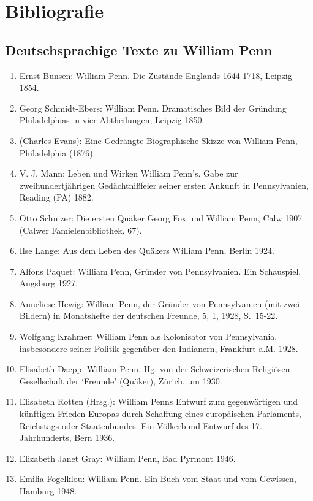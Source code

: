 \chapter{Bibliografie}


\section{Deutschsprachige Texte zu William Penn}

\begin{enumerate}
\item  Ernst Bunsen: William Penn. Die Zustände Englands 1644-1718, Leipzig
1854.
 \item Georg Schmidt-Ebers: William Penn. Dramatisches Bild der Gründung
Philadelphias in vier Abtheilungen, Leipzig 1850.
 \item (Charles Evans): Eine Gedrängte Biographische Skizze von William Penn,
Philadelphia (1876).
 \item V. J. Mann: Leben und Wirken William Penn’s. Gabe zur
zweihundertjährigen
Gedächtnißfeier seiner ersten Ankunft in Pennsylvanien, Reading (PA) 1882.
 \item Otto Schnizer:
Die ersten Quäker Georg Fox und William Penn,
Calw 1907 (Calwer Famielenbibliothek, 67).
 \item Ilse Lange: Aus dem Leben des Quäkers William Penn, Berlin 1924.
 \item Alfons Paquet: William Penn, Gründer von Pennsylvanien. Ein Schauspiel,
Augsburg 1927.
 \item Anneliese Hewig: William Penn, der Gründer von Pennsylvanien
(mit zwei Bildern) in Monatshefte der deutschen Freunde, 5, 1, 1928, S.~15-22.
 \item Wolfgang Krahmer: William Penn als Kolonisator von Pennsylvania,
insbesondere seiner Politik gegenüber den Indianern, Frankfurt a.M. 1928.
 \item Elisabeth Daepp: William Penn. Hg. von der Schweizerischen Religiösen
Gesellschaft der ‘Freunde’ (Quäker), Zürich, um 1930.
 \item Elisabeth Rotten (Hrsg.): William Penns Entwurf zum gegenwärtigen und
künftigen
Frieden Europas durch Schaffung eines europäischen Parlaments,
Reichstags oder Staatenbundes. Ein Völkerbund-Entwurf des 17. Jahrhunderts,
Bern 1936.
 \item Elizabeth Janet Gray: William Penn, Bad Pyrmont 1946.
 \item Emilia Fogelklou: William Penn. Ein Buch vom Staat und vom Gewissen,
Hamburg 1948.

\end{enumerate}
